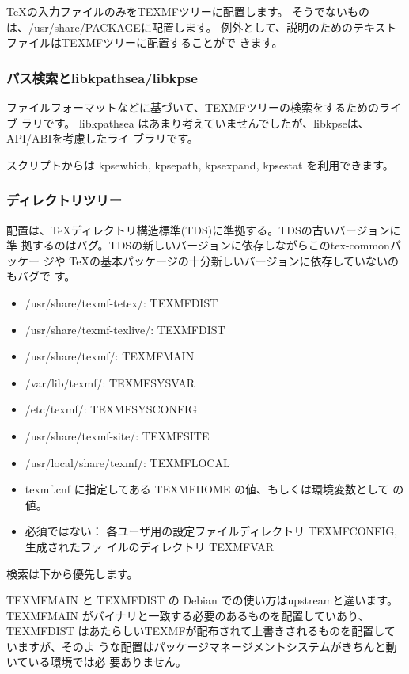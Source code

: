 \documentclass[mingoth,a4paper]{jsarticle}
\begin{document}
\TeX{}の入力ファイルのみをTEXMFツリーに配置します。
そうでないものは、/usr/share/PACKAGEに配置します。
例外として、説明のためのテキストファイルはTEXMFツリーに配置することがで
きます。

\subsubsection{パス検索とlibkpathsea/libkpse}

ファイルフォーマットなどに基づいて、TEXMFツリーの検索をするためのライブ
ラリです。
libkpathsea はあまり考えていませんでしたが、libkpseは、API/ABIを考慮したライ
ブラリです。

スクリプトからは kpsewhich, kpsepath, kpsexpand, kpsestat を利用できます。

\subsubsection{ディレクトリツリー}

配置は、\TeX ディレクトリ構造標準(TDS)に準拠する。TDSの古いバージョンに準
拠するのはバグ。TDSの新しいバージョンに依存しながらこのtex-commonパッケー
ジや \TeX の基本パッケージの十分新しいバージョンに依存していないのもバグで
す。


\begin{itemize}
 \item /usr/share/texmf-tetex/:  TEXMFDIST
 \item /usr/share/texmf-texlive/: TEXMFDIST
 \item /usr/share/texmf/: TEXMFMAIN
 \item /var/lib/texmf/: TEXMFSYSVAR
 \item /etc/texmf/:  TEXMFSYSCONFIG
 \item /usr/share/texmf-site/: TEXMFSITE
 \item /usr/local/share/texmf/:  TEXMFLOCAL
 \item texmf.cnf に指定してある  TEXMFHOME の値、もしくは環境変数として
       の値。
 \item 必須ではない： 各ユーザ用の設定ファイルディレクトリ TEXMFCONFIG, 生成されたファ
       イルのディレクトリ TEXMFVAR
\end{itemize}

検索は下から優先します。

TEXMFMAIN と TEXMFDIST の Debian での使い方はupstreamと違います。
TEXMFMAIN がバイナリと一致する必要のあるものを配置していあり、 TEXMFDIST 
はあたらしいTEXMFが配布されて上書きされるものを配置していますが、そのよ
うな配置はパッケージマネージメントシステムがきちんと動いている環境では必
要ありません。
\end{document}
